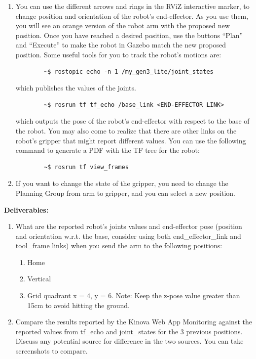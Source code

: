 \documentclass[12pt]{article}
\begin{document}
\begin{enumerate}
    \item You can use the different arrows and rings in the RViZ interactive marker, to change position and orientation of the robot’s end-effector. As you use them, you will see an orange version of the robot arm with the proposed new position. Once you have reached a desired position, use the buttons “Plan” and “Execute” to make the robot in Gazebo match the new proposed position. Some useful tools for you to track the robot’s motions are:
    \begin{verbatim}
        ~$ rostopic echo -n 1 /my_gen3_lite/joint_states
    \end{verbatim}
    which publishes the values of the joints.
    
    \begin{verbatim}
        ~$ rosrun tf tf_echo /base_link <END-EFFECTOR LINK>
    \end{verbatim}
    
    which outputs the pose of the robot’s end-effector with respect to the base of the robot. You may also come to realize that there are other links on the robot’s gripper that might report different values. You can use the following command to generate a PDF with the TF tree for the robot:
     \begin{verbatim}
        ~$ rosrun tf view_frames
    \end{verbatim}
    
    \item If you want to change the state of the gripper, you need to change the Planning Group from arm to gripper, and you can select a new position.
\end{enumerate}
\textbf{Deliverables:}
\begin{enumerate}
    \item What are the reported robot’s joints values and end-effector pose (position and orientation w.r.t. the base, consider using both end\_effector\_link and tool\_frame links) when you send the arm to the following positions:
    \begin{enumerate}
        \item Home
        \item Vertical
        \item Grid quadrant x = 4, y = 6. Note: Keep the z-pose value greater than 15cm to avoid hitting the ground.
    \end{enumerate}
    
    \item Compare the results reported by the Kinova Web App Monitoring against the reported values from tf\_echo and joint\_states for the 3 previous positions. Discuss any potential source for difference in the two sources. You can take screenshots to compare. 
    
\end{enumerate}
\end{document}
